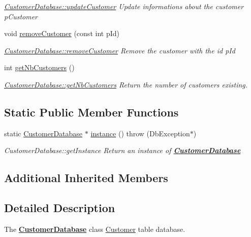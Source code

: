 \begin{DoxyCompactItemize}
\begin{DoxyCompactList}\small\item\em \hyperlink{classCustomerDatabase_a2ae17af9bcbf889dec21b4acae3161e1}{Customer\-Database\-::update\-Customer} Update informations about the customer {\itshape p\-Customer} \end{DoxyCompactList}\item 
void \hyperlink{classCustomerDatabase_aa1d21765bdf6319e580b3fcf20d841d1}{remove\-Customer} (const int p\-Id)
\begin{DoxyCompactList}\small\item\em \hyperlink{classCustomerDatabase_aa1d21765bdf6319e580b3fcf20d841d1}{Customer\-Database\-::remove\-Customer} Remove the customer with the id {\itshape p\-Id} \end{DoxyCompactList}\item 
int \hyperlink{classCustomerDatabase_a1c60ecbaa2594426b522746c70beee19}{get\-Nb\-Customers} ()
\begin{DoxyCompactList}\small\item\em \hyperlink{classCustomerDatabase_a1c60ecbaa2594426b522746c70beee19}{Customer\-Database\-::get\-Nb\-Customers} Return the number of customers existing. \end{DoxyCompactList}\end{DoxyCompactItemize}
\subsection*{Static Public Member Functions}
\begin{DoxyCompactItemize}
\item 
static \hyperlink{classCustomerDatabase}{Customer\-Database} $\ast$ \hyperlink{classCustomerDatabase_a2b9546b1e5803c4055529d2a7f7df95e}{instance} ()  throw (\-Db\-Exception$\ast$)
\begin{DoxyCompactList}\small\item\em Customer\-Database\-::get\-Instance Return an instance of {\bfseries \hyperlink{classCustomerDatabase}{Customer\-Database}} \end{DoxyCompactList}\end{DoxyCompactItemize}
\subsection*{Additional Inherited Members}


\subsection{Detailed Description}
The {\bfseries \hyperlink{classCustomerDatabase}{Customer\-Database}} class \hyperlink{classCustomer}{Customer} table database. 

